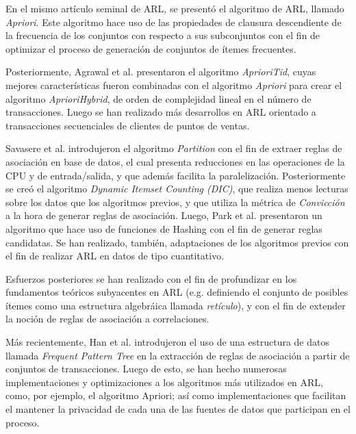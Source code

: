 En el mismo artículo seminal de ARL, se presentó el algoritmo de ARL, llamado \textit{Apriori}. Este algoritmo hace uso de las propiedades de clausura descendiente de la frecuencia de los conjuntos con respecto a sus subconjuntos con el fin de optimizar el proceso de generación de conjuntos de ítemes frecuentes.

Posteriormente, Agrawal et al. presentaron el algoritmo \textit{AprioriTid}, cuyas mejores características fueron combinadas con el algoritmo \textit{Apriori} para crear el algoritmo \textit{AprioriHybrid}, de orden de complejidad lineal en el número de transacciones\cite{agrawal1994fast}. Luego se han realizado más desarrollos en ARL orientado a transacciones secuenciales de clientes de puntos de ventas\cite{agrawal1995mining}.

Savasere et al. introdujeron el algoritmo \textit{Partition}\cite{savasere1995efficient} con el fin de extraer reglas de asociación en base de datos, el cual presenta reducciones en las operaciones de la CPU y de entrada/salida, y que además facilita la paralelización. Posteriormente se creó el algoritmo \textit{Dynamic Itemset Counting (DIC)}\cite{brin1997dynamic}, que realiza menos lecturas sobre los datos que los algoritmos previos, y que utiliza la métrica de \textit{Convicción} a la hora de generar reglas de asociación. Luego, Park et al. presentaron un algoritmo que hace uso de funciones de Hashing con el fin de generar reglas candidatas\cite{park1995effective}. Se han realizado, también, adaptaciones de los algoritmos previos con el fin de realizar ARL en datos de tipo cuantitativo\cite{srikant1996mining}.

Esfuerzos posteriores se han realizado con el fin de profundizar en los fundamentos teóricos subyacentes en ARL (e.g. definiendo el conjunto de posibles ítemes como una estructura algebráica llamada \textit{retículo})\cite{zaki1998theoretical}, y con el fin de extender la noción de reglas de asociación a correlaciones\cite{brin1997beyond}.

Más recientemente, Han et al. introdujeron el uso de una estructura de datos llamada \textit{Frequent Pattern Tree}\cite{han2004mining} en la extracción de reglas de asociación a partir de conjuntos de transacciones. Luego de esto, se han hecho numerosas implementaciones y optimizaciones a los algoritmos más utilizados en ARL, como, por ejemplo, el algoritmo Apriori\cite{bodon2010fast}; así como implementaciones que facilitan el mantener la privacidad de cada una de las fuentes de datos que participan en el proceso\cite{evfimievski2004privacy}.


